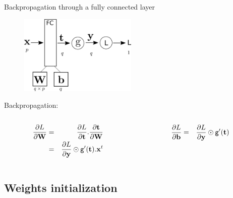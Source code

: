 \documentclass[xcolor=pdftex,dvipsnames,table,mathserif]{beamer}
\begin{document}
\begin{frame}{Backpropagation through a fully connected layer}
  \begin{figure}
    \includegraphics[width=0.5\textwidth]{bp_fc.png}
  \end{figure}

  Backpropagation:
  \begin{columns}
    \begin{column}{.5\textwidth}
      \begin{eqnarray*}
        \pdv{L}{\mathbf{W}} &=& \pdv{L}{\mathbf{t}}.\pdv{\mathbf{t}}{\mathbf{W}} \\
        &=& \pdv{L}{\mathbf{y}} \odot \texttt{g}'(\mathbf{t}).\mathbf{x}^t
      \end{eqnarray*}
    \end{column}

    \begin{column}{.5\textwidth}
      \begin{eqnarray*}
        \pdv{L}{\mathbf{b}} &=&  \pdv{L}{\mathbf{y}} \odot \texttt{g}'(\mathbf{t})
      \end{eqnarray*}
    \end{column}
  \end{columns}


\end{frame}


\subsection{Weights initialization}
\end{document}

